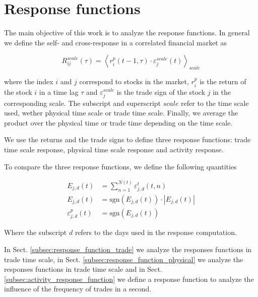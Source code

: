 \section{Response functions}\label{sec:response_functions}

The main objective of this work is to analyze the response functions. In
general we define the self- and cross-response in a correlated financial market
as

\begin{equation}\label{eq:response_general}
    R^{scale}_{ij}\left(\tau\right)=\left\langle r^{p}_{i}\left(t-1,
    \tau\right) \cdot\varepsilon^{scale}_{j} \left(t\right)\right\rangle
    _{scale}
\end{equation}

where the index $i$ and $j$ correspond to stocks in the market,
$r^{p}_{i}$ is the return of the stock $i$ in a time lag $\tau$ and
$\varepsilon^{scale}_{j}$ is the trade sign of the stock $j$ in the
corresponding scale. The subscript and superscript $scale$ refer to the time
scale used, wether physical time scale or trade time scale. Finally, we average
the product over the physical time or trade time depending on the time scale.

We use the returns and the trade signs to define three response functions:
trade time scale response, physical time scale response and activity response.

To compare the three response functions, we define the following quantities

\begin{align}
    E_{j,d}\left(t\right)&=\sum_{n=1}^{N\left(t\right)}
    \varepsilon_{j,d}^{t}\left(t,n\right)\\
    E_{j,d}\left(t\right)&=\text{sgn}\left(E_{j,d}\left(t\right)\right)
    \cdot\left|E_{j,d}\left(t\right)\right|\\
    \varepsilon_{j,d}^{p}\left(t\right)&=
    \text{sgn}\left(E_{j,d}\left(t\right)\right)
\end{align}

Where the subscript $d$ refers to the days used in the response computation.

In Sect. \ref{subsec:response_function_trade} we analyze the responses
functions in trade time scale, in Sect. \ref{subsec:response_function_physical}
we analyze the responses functions in trade time scale and in Sect.
\ref{subsec:activity_response_function} we define a response function to
analyze the influence of the frequency of trades in a second.

